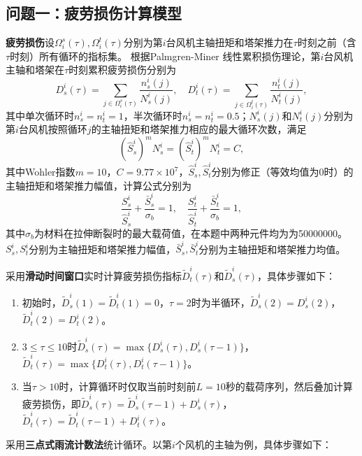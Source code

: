 \documentclass[bwprint]{gmcmthesis}
\numberwithin{figure}{section}
\begin{document}
\subsection{问题一：疲劳损伤计算模型}
\textbf{疲劳损伤}\quad 设$\Omega^s_i(\tau), \Omega^t_i(\tau)$分别为第$i$台风机主轴扭矩和塔架推力在$\tau$时刻之前（含$\tau$时刻）所有循环的指标集。
根据Palmgren-Miner 线性累积损伤理论，第$i$台风机主轴和塔架在$\tau$时刻累积疲劳损伤分别为
\begin{equation}
	D_s^i(\tau)=\sum_{j\in\Omega^s_i(\tau)}\frac{n_s^i(j)}{N_s^i(j)},\quad D_t^i(\tau)=\sum_{j\in\Omega^t_i(\tau)}\frac{n_t^i(j)}{N_t^i(j)},
\end{equation}
其中单次循环时$n_s^i=n_t^i=1$，半次循环时$n_s^i=n_t^i=0.5$；$N_s^i(j)$和$N_t^i(j)$分别为第$i$台风机按照循环$j$的主轴扭矩和塔架推力相应的最大循环次数，满足
\begin{equation}
	(\hat{S}_s^i)^mN^i_s=(\hat{S}_t^i)^mN^i_t=C,
\end{equation}
其中Wohler指数$m=10$，$C=9.77×10^7$，$\hat{S}_s^i, \hat{S}_t^i$分别为修正（等效均值为0时）的主轴扭矩和塔架推力幅值，计算公式分别为
\begin{equation}
	\frac{S^{i}_{s}}{\hat{S}^i_s}+\frac{\bar{S}^i_{s}}{\sigma _b}=1, \quad \frac{S^{i}_{t}}{\hat{S}^i_t}+\frac{\bar{S}^i_{t}}{\sigma _b}=1,
\end{equation}
其中$\sigma_b$为材料在拉伸断裂时的最大载荷值，在本题中两种元件均为为50000000。${S}_s^i, {S}_t^i$分别为主轴扭矩和塔架推力幅值，$\bar{S}_s^i, \bar{S}_t^i$分别为主轴扭矩和塔架推力均值。
\par 采用\textbf{滑动时间窗口}实时计算疲劳损伤指标$\tilde{D}^i_t(\tau)$和$\tilde{D}^i_s(\tau)$，具体步骤如下：
\begin{enumerate}
	\item 初始时，$\tilde{D}^i_s(1)=\tilde{D}^i_t(1)=0$，$\tau=2$时为半循环，$\tilde{D}^i_s(2)={D}^i_s(2)$，$\tilde{D}^i_t(2)={D}^i_t(2)$。
	\item $3\leq \tau\leq10$时$\tilde{D}^i_s(\tau)=\max\{{D}^i_s(\tau), {D}^i_s(\tau-1)\}$，$\tilde{D}^i_t(\tau)=\max\{{D}^i_t(\tau), {D}^i_t(\tau-1)\}$。
	\item 当$\tau>10$时，计算循环时仅取当前时刻前$L=10$秒的载荷序列，然后叠加计算疲劳损伤，即$\tilde{D}^i_s(\tau)=\tilde{D}^i_s(\tau-1)+{D}^i_s(\tau)$，$\tilde{D}^i_t(\tau)=\tilde{D}^i_t(\tau-1)+{D}^i_t(\tau)$。
\end{enumerate}
\par 采用\textbf{三点式雨流计数法}统计循环。以第$i$个风机的主轴为例，具体步骤如下：
\end{document}

